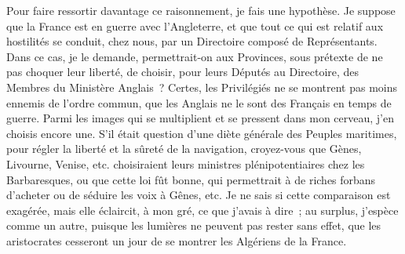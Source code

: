 \documentclass[french,twoside]{book} %
\begin{document}
Pour faire ressortir davantage ce raisonnement, je fais une hypothèse. Je suppose que la France est en guerre avec l’Angleterre, et que tout ce qui est relatif aux hostilités se conduit, chez nous, par un Directoire composé de Représentants. Dans ce cas, je le demande, permettrait-on aux Provinces, sous prétexte de ne pas choquer leur liberté, de choisir, pour leurs Députés au Directoire, des Membres du Ministère Anglais ? Certes, les Privilégiés ne se montrent pas moins ennemis de l’ordre commun, que les Anglais ne le sont des Français en temps de guerre. Parmi les images qui se multiplient et se pressent dans mon cerveau, j’en choisis encore une. S’il était question d’une diète générale des Peuples maritimes, pour régler la liberté et la sûreté de la navigation, croyez-vous que Gènes, Livourne, Venise, etc. choisiraient leurs ministres plénipotentiaires chez les Barbaresques, ou que cette loi fût bonne, qui permettrait à de riches forbans d’acheter ou de séduire les voix à Gênes, etc. Je ne sais si cette comparaison est exagérée, mais elle éclaircit, à mon gré, ce que j’avais à dire ; au surplus, j’espèce comme un autre, puisque les lumières ne peuvent pas rester sans effet, que les aristocrates cesseront un jour de se montrer les Algériens de la France.\par
\end{document}
